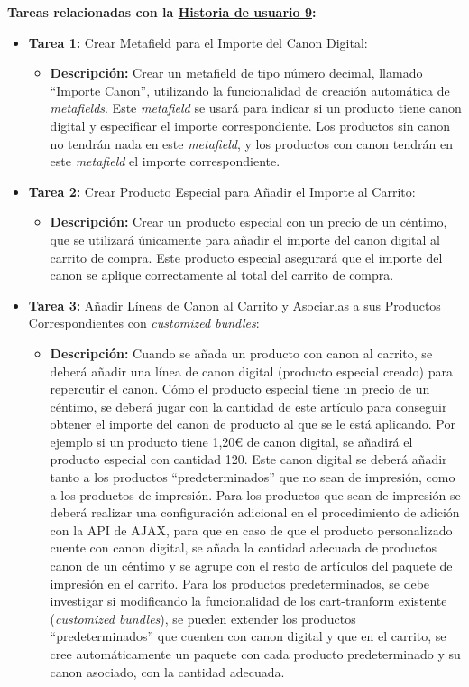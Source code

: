\documentclass[11pt]{article}
\begin{document}
\textbf{Tareas relacionadas con la \hyperref[sec:historia9]{Historia de usuario 9}:}
\begin{itemize}
    \item \textbf{Tarea 1:} Crear Metafield para el Importe del Canon Digital:
          \begin{itemize}[label=--]
              \item \textbf{Descripción:} Crear un metafield de tipo número decimal, llamado ``Importe Canon'', utilizando la funcionalidad de creación automática de \textit{metafields}. Este \textit{metafield} se usará para indicar si un producto tiene canon digital y especificar el importe correspondiente. Los productos sin canon no tendrán nada en este \textit{metafield}, y los productos con canon tendrán en este \textit{metafield} el importe correspondiente.
          \end{itemize}
    \item \textbf{Tarea 2:} Crear Producto Especial para Añadir el Importe al Carrito:
          \begin{itemize}[label=--]
              \item \textbf{Descripción:} Crear un producto especial con un precio de un céntimo, que se utilizará únicamente para añadir el importe del canon digital al carrito de compra. Este producto especial asegurará que el importe del canon se aplique correctamente al total del carrito de compra.
          \end{itemize}
    \item \textbf{Tarea 3:} Añadir Líneas de Canon al Carrito y Asociarlas a sus Productos Correspondientes con \textit{customized bundles}:
          \begin{itemize}[label=--]
              \item \textbf{Descripción:} Cuando se añada un producto con canon al carrito, se deberá añadir una línea de canon digital (producto especial creado) para repercutir el canon.
              Cómo el producto especial tiene un precio de un céntimo, se deberá jugar con la cantidad de este artículo para conseguir obtener el importe del canon de producto al que se le está aplicando. Por ejemplo
              si un producto tiene 1,20€ de canon digital, se añadirá el producto especial con cantidad 120.
              Este canon digital se deberá añadir tanto a los productos ``predeterminados'' que no sean de impresión, como a los productos de impresión.
              Para los productos que sean de impresión se deberá realizar una configuración adicional en el procedimiento de adición con la API de AJAX, para que en caso de que el producto personalizado cuente con canon digital, se añada la cantidad adecuada de productos canon de un céntimo y se agrupe con el resto de artículos del paquete de impresión en el carrito.
              Para los productos predeterminados, se debe investigar si modificando la funcionalidad de los cart-tranform existente (\textit{customized bundles}), se pueden extender los productos ``predeterminados'' que cuenten con canon digital y que en el carrito, se cree automáticamente un paquete con cada producto predeterminado y su canon asociado, con la cantidad adecuada.
          \end{itemize}
\end{itemize}
\end{document}
